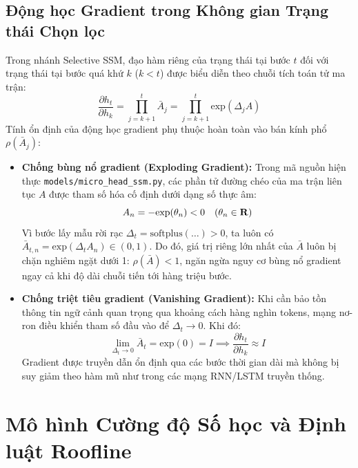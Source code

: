 \documentclass{uetgraduation}
\renewcommand{\mathbb}[1]{\text{\textbf{#1}}}
\renewcommand{\exp}{\text{exp}}
\begin{document}
\subsection{Động học Gradient trong Không gian Trạng thái Chọn lọc}
Trong nhánh Selective SSM, đạo hàm riêng của trạng thái tại bước $t$ đối với trạng thái tại bước quá khứ $k$ ($k < t$) được biểu diễn theo chuỗi tích toán tử ma trận:
\begin{equation}
\frac{\partial h_t}{\partial h_k} = \prod_{j=k+1}^t \bar{A}_j = \prod_{j=k+1}^t \exp(\Delta_j A)
\end{equation}
Tính ổn định của động học gradient phụ thuộc hoàn toàn vào bán kính phổ $\rho(\bar{A}_j)$:
\begin{itemize}
    \item \textbf{Chống bùng nổ gradient (Exploding Gradient):} Trong mã nguồn hiện thực \texttt{models/micro\_head\_ssm.py}, các phần tử đường chéo của ma trận liên tục $A$ được tham số hóa cố định dưới dạng số thực âm:
    \begin{equation}
    A_n = -\exp(\theta_n) < 0 \quad (\theta_n \in \mathbb{R})
    \end{equation}
    Vì bước lấy mẫu rời rạc $\Delta_t = \text{softplus}(\dots) > 0$, ta luôn có $\bar{A}_{t,n} = \exp(\Delta_t A_n) \in (0, 1)$. Do đó, giá trị riêng lớn nhất của $\bar{A}$ luôn bị chặn nghiêm ngặt dưới 1: $\rho(\bar{A}) < 1$, ngăn ngừa nguy cơ bùng nổ gradient ngay cả khi độ dài chuỗi tiến tới hàng triệu bước.
    \item \textbf{Chống triệt tiêu gradient (Vanishing Gradient):} Khi cần bảo tồn thông tin ngữ cảnh quan trọng qua khoảng cách hàng nghìn tokens, mạng nơ-ron điều khiển tham số đầu vào để $\Delta_t \to 0$. Khi đó:
    \begin{equation}
    \lim_{\Delta_t \to 0} \bar{A}_t = \exp(0) = I \implies \frac{\partial h_t}{\partial h_k} \approx I
    \end{equation}
    Gradient được truyền dẫn ổn định qua các bước thời gian dài mà không bị suy giảm theo hàm mũ như trong các mạng RNN/LSTM truyền thống.
\end{itemize}

\section{Mô hình Cường độ Số học và Định luật Roofline}
\end{document}
